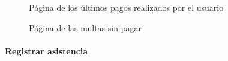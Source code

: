 \begin{figure}[H]
    \centering
    \caption{Página de los últimos pagos realizados por el usuario}
    \label{fig:app-pagos}
\end{figure}

\begin{figure}[H]
    \centering
    \caption{Página de las multas sin pagar}
    \label{fig:app-multas}
\end{figure}


\paragraph{Registrar asistencia}

